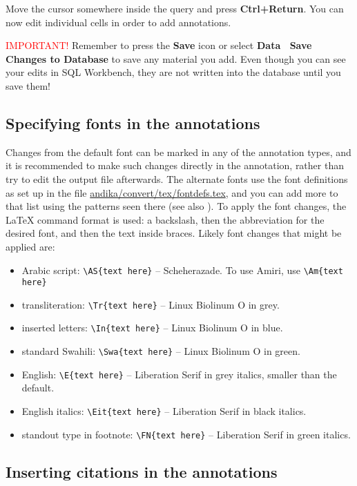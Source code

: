 Move the cursor somewhere inside the query and press \textbf{Ctrl+Return}.  You can now edit individual cells in order to add annotations.  

\textcolor{red}{IMPORTANT!} Remember to press the \textbf{Save} icon or select \textbf{Data \textrightarrow\ Save Changes to Database} to save any material you add.  Even though you can see your edits in SQL Workbench, they are not written into the database until you save them!

\subsection{Specifying fonts in the annotations}
\label{ss:annotationfonts}

Changes from the default font can be marked in any of the annotation types, and it is recommended to make such changes directly in the annotation, rather than try to edit the output file afterwards.  The alternate fonts use the font definitions as set up in the file \url{andika/convert/tex/fontdefs.tex}, and you can add more to that list using the patterns seen there (see also ).  To apply the font changes, the LaTeX command format is used: a backslash, then the abbreviation for the desired font, and then the text inside braces.  Likely font changes that might be applied are:
\begin{itemize}
\item Arabic script: \verb|\AS{text here}| -- Scheherazade.  To use Amiri, use \verb|\Am{text here}|
\item transliteration: \verb|\Tr{text here}| -- Linux Biolinum O in grey.
\item inserted letters: \verb|\In{text here}| -- Linux Biolinum O in blue.
\item standard Swahili: \verb|\Swa{text here}| -- Linux Biolinum O in green.
\item English: \verb|\E{text here}| -- Liberation Serif in grey italics, smaller than the default.
\item English italics: \verb|\Eit{text here}| -- Liberation Serif in black italics.	
\item standout type in footnote: \verb|\FN{text here}| -- Liberation Serif in green italics. 
\end{itemize}

\subsection{Inserting citations in the annotations}

